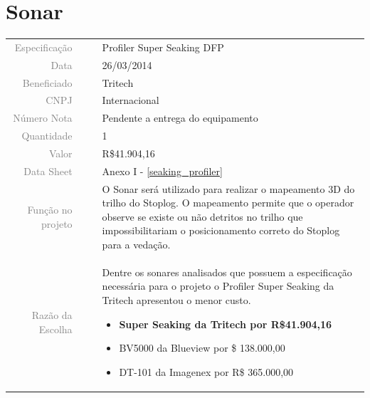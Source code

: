 




\section{Sonar}
\label{sonar}


\begin{table}[ht!]

	\begin{tabular}{r l|l p{12cm} }
		
		\textcolor{gray}{Especificação} &&& 	{Profiler Super Seaking DFP}\\
		\textcolor{gray}{Data} &&& 				{26/03/2014}\\
        \textcolor{gray}{Beneficiado} &&&		{Tritech} \\
        \textcolor{gray}{CNPJ} &&& 				{Internacional} \\
        \textcolor{gray}{Número Nota} &&& 		{Pendente a entrega do equipamento} \\
		\textcolor{gray}{Quantidade} &&& 		{1} \\
		\textcolor{gray}{Valor} &&& 			{R\$41.904,16} \\
		\textcolor{gray}{Data Sheet} &&& 		{Anexo I - \ref{seaking_profiler}} \\

		\textcolor{gray}{Função no projeto} &&& {O Sonar será utilizado para realizar o mapeamento 3D do trilho do Stoplog. O mapeamento permite que o operador observe se existe ou não detritos no trilho que impossibilitariam o posicionamento correto do Stoplog para a vedação. } \\
		\textcolor{gray}{Razão da Escolha} &&& {Dentre os sonares analisados que possuem a especificação necessária para o projeto o Profiler Super Seaking da Tritech apresentou o menor custo.   
		 \begin{itemize}
		  \item \textbf {Super Seaking da Tritech por R\$41.904,16}
		  \item BV5000 da Blueview por \$ 138.000,00 
		  \item DT-101 da Imagenex por R\$ 365.000,00
		\end{itemize}}

	\end{tabular}
\end{table}

